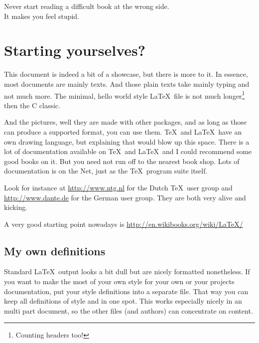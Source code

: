\renewcommand\TheFile{ch07_poser.tex}
\begin{savequote}[15cm]
  \vspace{-30mm}
  \raggedleft
  \sffamily
  Never start reading a difficult book at the wrong side.\\ 
  It makes you feel stupid.
\end{savequote}
\chapter{Starting yourselves?} 


This document is indeed a bit of a showcase, but there is more to it.
In essence, most documents are mainly texts. 
And those plain texts take mainly typing and not much more.
The minimal, hello world style \LaTeX\ file is not much 
longer\footnote{Counting headers too!} then the C classic.


And the pictures, well they are made with other packages, and as long
as those can produce a supported format, you can use them. \TeX\ and
\LaTeX\ have an own drawing language, but explaining that would blow
up this space.
There is a lot of documentation available on \TeX\ and \LaTeX\ and I
could recommend some good books on it.
But you need not run off to the nearest book shop. Lots of
documentation is on the Net, just as the \TeX\ program suite itself. 

Look for instance at \url{http://www.ntg.nl} for the Dutch \TeX\ user group
and \url{http://www.dante.de} for the German user group. They are both very 
alive and kicking.

A very good starting point nowadays is \url{http://en.wikibooks.org/wiki/LaTeX/}

\section{My own definitions}
Standard \LaTeX\ output looks a bit dull but are nicely formatted nonetheless.
If you want to make the most of your own style for your own or your
projects documentation, put your style definitions into a separate
file. That way you can keep all definitions of style and  in one
spot. This works especially nicely in an multi part document, so
the other files (and authors) can concentrate on content.


